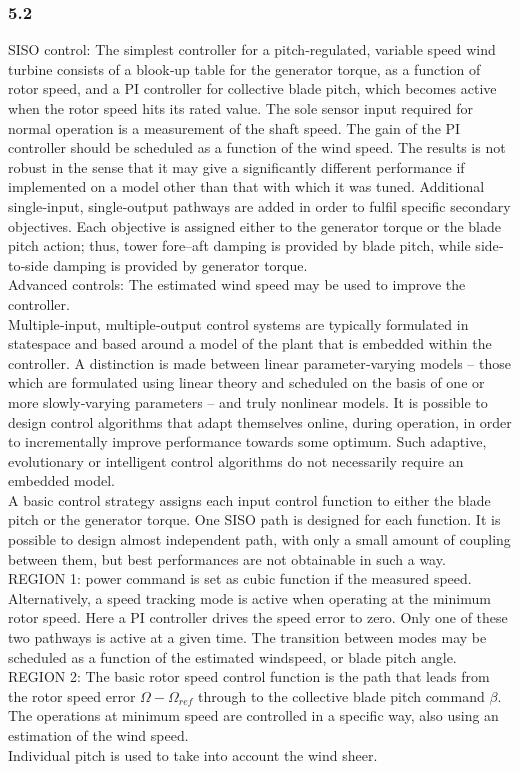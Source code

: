 \documentclass[]{article}
\begin{document}
\subsubsection{5.2}
SISO control: The simplest controller for a pitch‐regulated, variable speed wind turbine consists of a blook‐up table for the generator torque, as a function of rotor speed, and a PI controller for collective blade pitch, which becomes active when the rotor speed hits its rated value. The sole sensor input required for normal operation is a measurement of the shaft speed. The gain of the PI controller should be scheduled as a function of the wind speed. The results is not robust in the sense that it may give a significantly different performance if implemented on a model other than that with which it was tuned. Additional single‐input, single‐output pathways are added in order to fulfil specific secondary objectives. Each objective is assigned either to the generator torque or the blade pitch action; thus, tower fore–aft damping is provided by blade pitch, while side‐to‐side damping is provided by generator torque. \\ 
Advanced controls: The estimated wind speed may be used to improve the controller. \\
Multiple‐input, multiple‐output control systems are typically formulated in statespace and based around a model of the plant that is embedded within the controller. A distinction is made between linear parameter‐varying models – those which are formulated using linear theory and scheduled on the basis of one or more slowly‐varying parameters – and truly nonlinear models. It is possible to design control algorithms that adapt themselves online, during operation, in order to incrementally improve performance towards some optimum. Such adaptive, evolutionary or intelligent control algorithms do not necessarily require an embedded model.\\
A basic control strategy assigns each input control function to either the blade pitch or the generator torque. One SISO path is designed for each function. It is possible to design almost independent path, with only a small amount of coupling between them, but best performances are not obtainable in such a way.  \\
REGION 1: power command is set as cubic function if the measured speed. Alternatively, a speed tracking mode is active when operating at the minimum rotor speed. Here a PI controller drives the speed error to zero. Only one of these two pathways is active at a given time. The transition between modes may be scheduled as a function of the estimated windspeed, or blade pitch angle.\\
REGION 2: The basic rotor speed control function is the path that leads from the rotor speed error $\Omega - \Omega_{ref}$ through to the collective blade pitch command $\beta$. The operations at minimum speed are controlled in a specific way, also using an estimation of the wind speed. \\
Individual pitch is used to take into account the wind sheer. 
\end{document}
